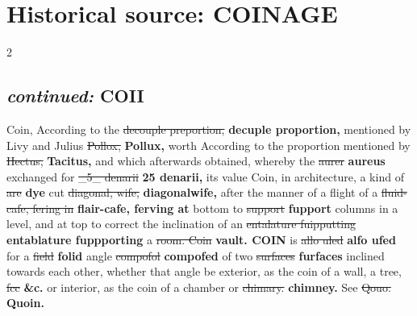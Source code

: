 \documentclass[10pt]{article}
\begin{document}
\section*{Historical source: COINAGE}
\begin{multicols}{2}
\subsection*{\textit{continued:} COII}
Coin, According to the \sout{decouple preportion,} \textbf{decuple proportion,} mentioned by Livy and Julius \sout{Pollox,} \textbf{Pollux,} worth According to the proportion mentioned by \sout{Hectus,} \textbf{Tacitus,} and which afterwards obtained, whereby the \sout{aurer} \textbf{aureus} exchanged for \sout{\_5\_ denarii} \textbf{25 denarii,} its value Coin, in architecture, a kind of \sout{are} \textbf{dye} cut \sout{diagonal, wife,} \textbf{diagonalwife,} after the manner of a flight of a \sout{fluid-cafe, fering in} \textbf{flair-cafe, ferving at} bottom to \sout{support} \textbf{fupport} columns in a level, and at top to correct the inclination of an \sout{entalature fuipputting} \textbf{entablature fuppporting} a \sout{room. Coin} \textbf{vault. COIN} is \sout{allo uled} \textbf{alfo ufed} for a \sout{field} \textbf{folid} angle \sout{compofol} \textbf{compofed} of two \sout{surfaces} \textbf{furfaces} inclined towards each other, whether that angle be exterior, as the coin of a wall, a tree, \sout{fcc} \textbf{\&c.} or interior, as the coin of a chamber or \sout{chimary.} \textbf{chimney.} See \sout{Qouo.} \textbf{Quoin.}


\end{multicols}
\end{document}

